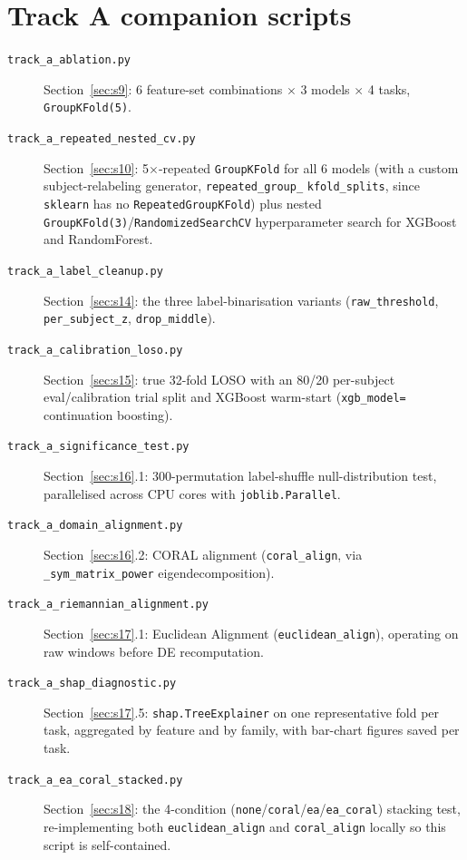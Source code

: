 \documentclass[11pt]{report}
\begin{document}
\section{Track A companion scripts}
\begin{description}
  \item[\texttt{track\_a\_ablation.py}] Section~\ref{sec:s9}: 6 feature-set
        combinations $\times$ 3 models $\times$ 4 tasks, \texttt{GroupKFold(5)}.
  \item[\texttt{track\_a\_repeated\_nested\_cv.py}] Section~\ref{sec:s10}:
        5$\times$-repeated \texttt{GroupKFold} for all 6 models (with a
        custom subject-relabeling generator, \texttt{repeated\_group\_}\linebreak
        \texttt{kfold\_splits}, since \texttt{sklearn} has no
        \texttt{RepeatedGroupKFold}) plus nested
        \texttt{GroupKFold(3)}/\texttt{RandomizedSearchCV} hyperparameter
        search for XGBoost and RandomForest.
  \item[\texttt{track\_a\_label\_cleanup.py}] Section~\ref{sec:s14}: the
        three label-binarisation variants (\texttt{raw\_threshold},
        \texttt{per\_subject\_z}, \texttt{drop\_middle}).
  \item[\texttt{track\_a\_calibration\_loso.py}] Section~\ref{sec:s15}: true
        32-fold LOSO with an 80/20 per-subject eval/calibration trial split
        and XGBoost warm-start (\texttt{xgb\_model=} continuation boosting).
  \item[\texttt{track\_a\_significance\_test.py}] Section~\ref{sec:s16}.1:
        300-permutation label-shuffle null-distribution test, parallelised
        across CPU cores with \texttt{joblib.Parallel}.
  \item[\texttt{track\_a\_domain\_alignment.py}] Section~\ref{sec:s16}.2:
        CORAL alignment (\texttt{coral\_align}, via
        \texttt{\_sym\_matrix\_power} eigendecomposition).
  \item[\texttt{track\_a\_riemannian\_alignment.py}] Section~\ref{sec:s17}.1:
        Euclidean Alignment (\texttt{euclidean\_align}), operating on raw
        windows before DE recomputation.
  \item[\texttt{track\_a\_shap\_diagnostic.py}] Section~\ref{sec:s17}.5:
        \texttt{shap.TreeExplainer} on one representative fold per task,
        aggregated by feature and by family, with bar-chart figures saved
        per task.
  \item[\texttt{track\_a\_ea\_coral\_stacked.py}] Section~\ref{sec:s18}: the
        4-condition (\texttt{none}/\texttt{coral}/\texttt{ea}/\texttt{ea\_coral})
        stacking test, re-implementing both \texttt{euclidean\_align} and
        \texttt{coral\_align} locally so this script is self-contained.
\end{description}
\end{document}
